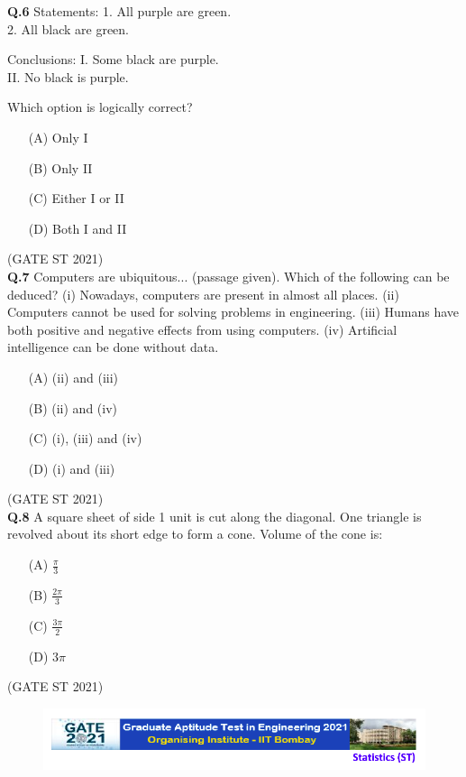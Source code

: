 \documentclass[journal,12pt,onecolumn]{IEEEtran}
\theoremstyle{remark}
\begin{document}
\textbf{Q.6}
Statements:  
1. All purple are green. \\ 
2. All black are green.  

Conclusions: 
I. Some black are purple.  \\
II. No black is purple.

Which option is logically correct?
\begin{enumerate}
\item[(A)] Only I  
\item[(B)] Only II  
\item[(C)] Either I or II  
\item[(D)] Both I and II
\end{enumerate}

\hfill (GATE ST 2021)\\
\textbf{Q.7}
Computers are ubiquitous... (passage given).  
Which of the following can be deduced?  
(i) Nowadays, computers are present in almost all places.  
(ii) Computers cannot be used for solving problems in engineering.  
(iii) Humans have both positive and negative effects from using computers.  
(iv) Artificial intelligence can be done without data.

\begin{enumerate}
\item[(A)] (ii) and (iii)
\item[(B)] (ii) and (iv)
\item[(C)] (i), (iii) and (iv)
\item[(D)] (i) and (iii)
\end{enumerate}

\hfill (GATE ST 2021)\\

\textbf{Q.8}
A square sheet of side 1 unit is cut along the diagonal.  
One triangle is revolved about its short edge to form a cone.  
Volume of the cone is:

\begin{enumerate}
\item[(A)] $\frac{\pi}{3}$
\item[(B)] $\frac{2\pi}{3}$
\item[(C)] $\frac{3\pi}{2}$
\item[(D)] $3\pi$
\end{enumerate}
\hfill (GATE ST 2021)\\


\begin{figure}
 \centering
    \includegraphics[width=0.8\linewidth]{figs/0.png} 
\end{figure}
\end{document}
